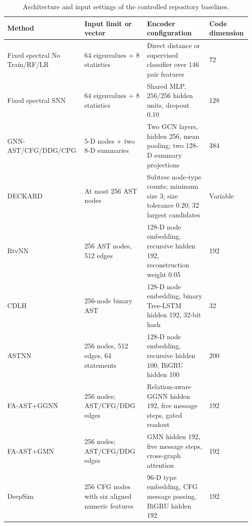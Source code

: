 \documentclass[authoryear,final,5p,times,twocolumn]{elsarticle}
\theoremstyle{plain}
\begin{document}
\begingroup
\color{green!50!black}
\begin{table}[t]
\centering
\caption{Architecture and input settings of the controlled repository baselines.}
\label{tab:baseline_architecture}
\scriptsize
\renewcommand{\arraystretch}{1.10}
\setlength{\tabcolsep}{3pt}
\begin{tabularx}{\textwidth}{@{}p{}p{}X p{}@{}}
\toprule
Method & Input limit or vector & Encoder configuration & Code dimension \\
\midrule
Fixed spectral No Train/RF/LR & 64 eigenvalues + 8 statistics &
Direct distance or supervised classifier over 146 pair features & 72 \\
Fixed spectral SNN & 64 eigenvalues + 8 statistics &
Shared MLP, $256/256$ hidden units, dropout 0.10 & 128 \\
GNN-AST/CFG/DDG/CPG & 5-D nodes + two 8-D summaries &
Two GCN layers, hidden 256, mean pooling; two 128-D summary projections & 384 \\
DECKARD & At most 256 AST nodes &
Subtree node-type counts; minimum size 3; size tolerance 0.20; 32 largest candidates & Variable \\
RtvNN & 256 AST nodes, 512 edges &
128-D node embedding, recursive hidden 192, reconstruction weight 0.05 & 192 \\
CDLH & 256-node binary AST &
128-D node embedding, binary Tree-LSTM hidden 192, 32-bit hash & 32 \\
ASTNN & 256 nodes, 512 edges, 64 statements &
128-D node embedding, recursive hidden 100, BiGRU hidden 100 & 200 \\
FA-AST+GGNN & 256 nodes; AST/CFG/DDG edges &
Relation-aware GGNN hidden 192, five message steps, gated readout & 192 \\
FA-AST+GMN & 256 nodes; AST/CFG/DDG edges &
GMN hidden 192, five message steps, cross-graph attention & 192 \\
DeepSim & 256 CFG nodes with six aligned numeric features &
96-D type embedding, CFG message passing, BiGRU hidden 192 & 192 \\
\bottomrule
\end{tabularx}
\end{table}
\end{document}
